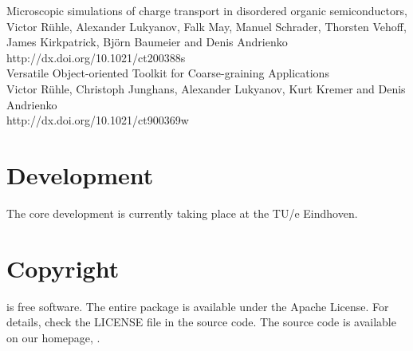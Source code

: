 \vspace{0.1cm}
\noindent
\cite{ruhle_microscopic_2011} Microscopic simulations of charge transport in 
disordered organic semiconductors, \\
Victor R\"uhle, Alexander Lukyanov, Falk May, Manuel Schrader, Thorsten Vehoff, 
James Kirkpatrick, Bj\"orn Baumeier and Denis Andrienko \\
{http://dx.doi.org/10.1021/ct200388s} \\

\vspace{0.1cm}
\noindent
\cite{ruhle_versatile_2009} Versatile Object-oriented Toolkit for 
Coarse-graining Applications \\
Victor R\"uhle, Christoph Junghans, Alexander Lukyanov, Kurt Kremer and Denis 
Andrienko \\
{http://dx.doi.org/10.1021/ct900369w}

\section*{Development}
The core development is currently taking place at the TU/e Eindhoven.

\section*{Copyright}
\votcaxtp is free software. The entire package is available under the Apache 
License. For details, check
the LICENSE file in the source code. The \votcaxtp source code is available on 
our homepage, 
.

\vfill
